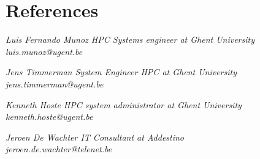 \documentclass[margin, 10pt]{res} %
\begin{document}
\section{References}
{\sl Luis Fernando Munoz \hfill HPC Systems engineer at Ghent University \\
luis.munoz@ugent.be
}

{\sl Jens Timmerman \hfill System Engineer HPC at Ghent University \\
jens.timmerman@ugent.be
}

{\sl Kenneth Hoste \hfill HPC system administrator at Ghent University \\
kenneth.hoste@ugent.be
}

{\sl Jeroen De Wachter \hfill IT Consultant at Addestino  \\
jeroen.de.wachter@telenet.be
}
\end{document}
